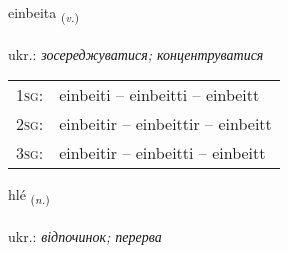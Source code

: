 \documentclass[frontgrid, backgrid]{flacards}\usepackage[]{graphicx}\usepackage[]{xcolor}
\begin{document}
\renewcommand{\blhead}{\vskip5pt {\small\bfseries\footnotesize Sagnorð | дієслово }}
\renewcommand{\bcfoot}{\vskip5pt \hspace{2pt}{\small\bfseries\footnotesize 3K}}


{einbeita \small{\textsubscript{(\textit{v.})}} \\[1ex] %
\textphonetic{[einpeita]} \\
ukr.: \emph{зосереджуватися; концентруватися} \\  [2ex]
\renewcommand*{\arraystretch}{0.8}
\begin{tabular}{p{1cm}l}
\textsc{1sg}: & einbeiti -- einbeitti -- einbeitt \\ 
\textsc{2sg}: & einbeitir -- einbeittir -- einbeitt \\ 
\textsc{3sg}: & einbeitir -- einbeitti -- einbeitt \\ 
\end{tabular}
}

\renewcommand{\flhead}{\vskip5pt \fboxsep=0pt {\small\bfseries\footnotesize Nafnorð | іменник}}
\renewcommand{\fcfoot}{\vskip5pt \fboxsep=0pt \hspace{2pt}{\small\bfseries\footnotesize 3K}}

\renewcommand{\blhead}{\vskip5pt {\small\bfseries\footnotesize Nafnorð | іменник }}
\renewcommand{\bcfoot}{\vskip5pt \hspace{2pt}{\small\bfseries\footnotesize 3K}}


{hlé \small{\textsubscript{(\textit{n.})}} \\[1ex] %
\textphonetic{[l̥jɛː]} \\
ukr.: \emph{відпочинок; перерва} \\  [2ex]
\renewcommand*{\arraystretch}{0.8}
}
\end{document}
